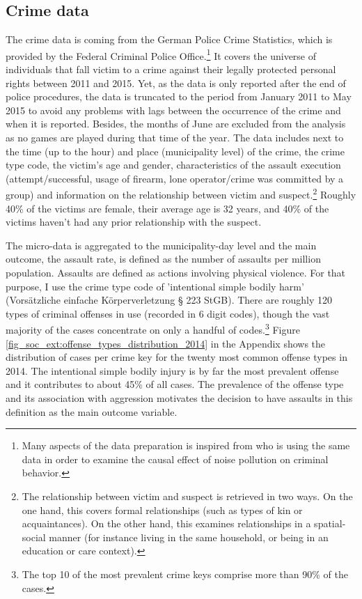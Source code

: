 \documentclass[11pt, a4paper]{article} %
\begin{document}
\subsection{Crime data}
The crime data is coming from the German Police Crime Statistics, which is provided by the Federal Criminal Police Office.\footnote{Many aspects of the data preparation is inspired from \cite{hener2019noise} who is using the same data in order to examine the causal effect of noise pollution on criminal behavior.} It covers the universe of individuals that fall victim to a crime against their legally protected personal rights between 2011 and 2015. Yet, as the data is only reported after the end of police procedures, the data is truncated to the period from January 2011 to May 2015 to avoid any problems with lags between the occurrence of the crime and when it is reported. Besides, the months of June are excluded from the analysis as no games are played during that time of the year. The data includes next to the time (up to the hour) and place (municipality level) of the crime, the crime type code, the victim's age and gender, characteristics of the assault execution (attempt/successful, usage of firearm, lone operator/crime was committed by a group) and information on the relationship between victim and suspect.\footnote{The relationship between victim and suspect is retrieved in two ways. On the one hand, this covers formal relationships (such as types of kin or acquaintances). On the other hand, this examines relationships in a spatial-social manner (for instance living in the same household, or being in an education or care context).} Roughly 40\% of the victims are female, their average age is 32 years, and 40\% of the victims haven't had any prior relationship with the suspect.

The micro-data is aggregated to the municipality-day level and the main outcome, the assault rate, is defined as the number of assaults per million population. Assaults are defined as actions involving physical violence. For that purpose, I use the crime type code of 'intentional simple bodily harm' (Vorsätzliche einfache Körperverletzung § 223 StGB). There are roughly 120 types of criminal offenses in use (recorded in 6 digit codes), though the vast majority of the cases concentrate on only a handful of codes.\footnote{The top 10 of the most prevalent crime keys comprise more than 90\% of the cases.} Figure \ref{fig_soc_ext:offense_types_distribution_2014} in the Appendix shows the distribution of cases per crime key for the twenty most common offense types in 2014. The intentional simple bodily injury is by far the most prevalent offense and it contributes to about 45\% of all cases. The prevalence of the offense type and its association with aggression motivates the decision to have assaults in this definition as the main outcome variable.
\end{document}
